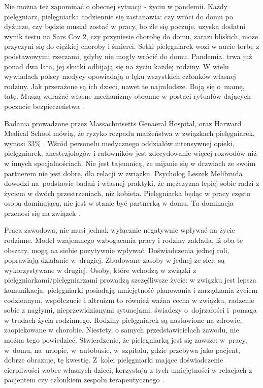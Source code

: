 \documentclass[a4paper,12pt,twoside,openright]{mwrep}
\begin{document}
Nie można też zapominać o obecnej sytuacji - życiu w pandemii. Każdy pielęgniarz, pielęgniarka codziennie się zastanawia: czy wróci do domu po dyżurze, czy będzie musiał zostać w pracy, bo źle się poczuje, uzyska dodatni wynik testu na Sars Cov 2, czy przyniesie chorobę do domu, zarazi bliskich, może przyczyni się do ciężkiej choroby i śmierci. Setki pielęgniarek wozi w aucie torbę z podstawowymi rzeczami, gdyby nie mogły wrócić do domu. Pandemia, trwa już ponad dwa lata, jej skutki odbijają się na życiu każdej rodziny. W wielu wywiadach polscy medycy opowiadają o lęku wszystkich członków własnej rodziny. Jak przerażone są ich dzieci, nawet te najmłodsze. Boją się o~mamę, tatę. Muszą wdrażać własne mechanizmy obronne w postaci rytuałów dających poczucie bezpieczeństwa  \cite{wywiad}.

Badania prowadzone przez Massachutsetts Genaeral Hospital, oraz Harward Medical School mówią, że ryzyko rozpadu małżeństwa w związkach pielęgniarek, wynosi 33\% \cite{rozwody}. Wśród personelu medycznego oddziałów intensywnej opieki, pielęgniarek, anestezjologów i ratowników jest zdecydowanie więcej rozwodów niż w innych specjalnościach.  Nie jest tajemnicą, że mijanie się w drzwiach ze swoim partnerem nie jest dobre, dla relacji w związku. Psycholog Leszek Melibruda dowodzi na~podstawie badań i własnej praktyki, że mężczyzna lepiej sobie radzi z życiem w dwóch przestrzeniach, niż kobieta. Pielęgniarka będąc w pracy często osobą dominującą, nie jest w stanie być partnerką w domu. Ta dominacja przenosi się na związek \cite{melibruda}.

Praca zawodowa, nie musi jednak wyłącznie negatywnie wpływać na życie rodzinne. Model wzajemnego wzbogacania pracy i rodziny zakłada, iż oba te obszary, mogą na siebie pozytywnie wpływać. Doświadczenia jednej roli, poprawiają działanie w~drugiej. Zbudowane zasoby w jednej ze sfer, są wykorzystywane w drugiej.  Osoby, które wchodzą w związki z pielęgniarkami/pielęgniarzami prowadzą szczęśliwsze życie: w związku jest lepsza komunikacja, pielęgniarki posiadają umiejętność planowania i zarządzania życiem codziennym, współczucie i altruizm to również ważna cecha w związku, radzenie sobie z nagłymi, nieprzewidzianymi sytuacjami, świadczy o~dojrzałości i~pomaga w trudach życia rodzinnego. Rodziny pielęgniarek są nastawione na zdrowie, zaopiekowane w chorobie. Niestety, o samych przedstawicielach zawodu, nie można tego powiedzieć. Stwierdzenie, że pielęgniarką jest się zawsze: w~pracy, w~domu, na~urlopie, w~autobusie, w~szpitalu, gdzie przebywa jako pacjent, dobrze obrazuje, tę kwestię. Z~kolei pielęgniarki mające doświadczenie cierpliwości wobec własnych dzieci, korzystają z tych umiejętności w relacjach z pacjentem czy członkiem zespołu terapeutycznego \cite{wzbogacanie}.
\end{document}

